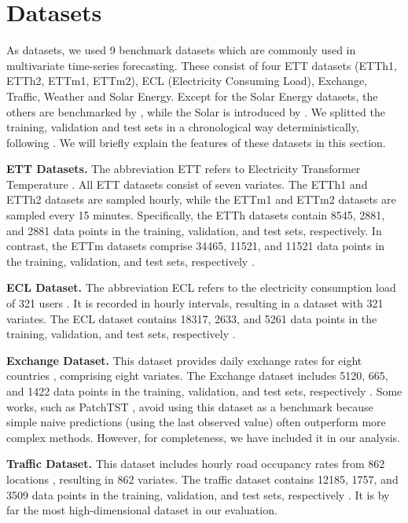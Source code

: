 \section{Datasets}
As datasets, we used 9 benchmark datasets which are commonly used in multivariate time-series forecasting. These consist of four ETT datasets \cite{haoyietal-informer-2021} (ETTh1, ETTh2, ETTm1, ETTm2), ECL (Electricity Consuming Load), Exchange, Traffic, Weather and Solar Energy.   Except for the Solar Energy datasets, the others are benchmarked by \cite{wu2021autoformer}, while the Solar is introduced by \cite{LSTNet}. We splitted the training, validation and test sets in a chronological way deterministically, following \cite{Yuqietal-2023-PatchTST, liu2023itransformer}.  We will briefly explain the features of these datasets in this section. 

\textbf{ETT Datasets.} The abbreviation ETT refers to Electricity Transformer Temperature \cite{haoyietal-informer-2021}. All ETT datasets consist of seven variates. The ETTh1 and ETTh2 datasets are sampled hourly, while the ETTm1 and ETTm2 datasets are sampled every 15 minutes. Specifically, the ETTh datasets contain 8545, 2881, and 2881 data points in the training, validation, and test sets, respectively. In contrast, the ETTm datasets comprise 34465, 11521, and 11521 data points in the training, validation, and test sets, respectively \cite{liu2023itransformer}.

\textbf{ECL Dataset.} The abbreviation ECL refers to the electricity consumption load of 321 users \cite{wu2021autoformer}. It is recorded in hourly intervals, resulting in a dataset with 321 variates. The ECL dataset contains 18317, 2633, and 5261 data points in the training, validation, and test sets, respectively \cite{liu2023itransformer}.

\textbf{Exchange Dataset.} This dataset provides daily exchange rates for eight countries \cite{wu2021autoformer}, comprising eight variates. The Exchange dataset includes 5120, 665, and 1422 data points in the training, validation, and test sets, respectively \cite{liu2023itransformer}. Some works, such as PatchTST \cite{Yuqietal-2023-PatchTST}, avoid using this dataset as a benchmark because simple naive predictions (using the last observed value) often outperform more complex methods. However, for completeness, we have included it in our analysis.

\textbf{Traffic Dataset.} This dataset includes hourly road occupancy rates from 862 locations \cite{wu2021autoformer}, resulting in 862 variates. The traffic dataset contains 12185, 1757, and 3509 data points in the training, validation, and test sets, respectively \cite{liu2023itransformer}. It is by far the most high-dimensional dataset in our evaluation. 


